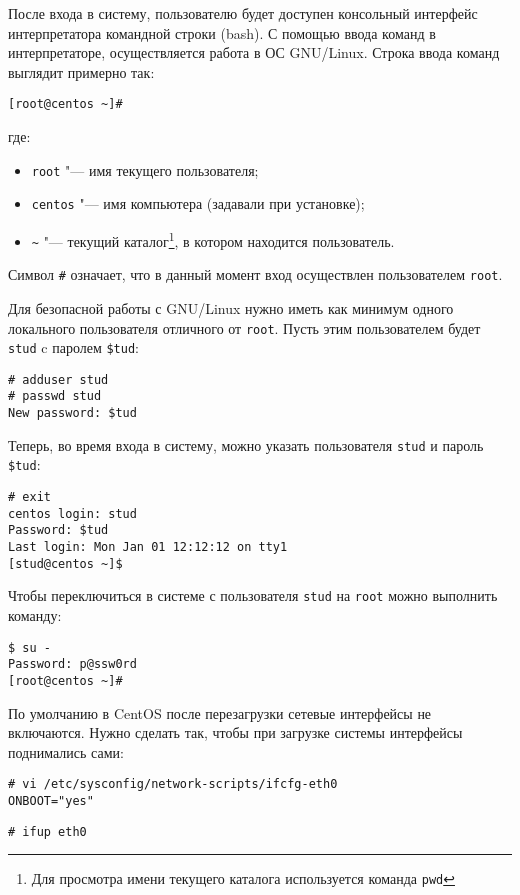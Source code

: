 После входа в систему, пользователю будет доступен консольный интерфейс интерпретатора командной строки (bash). 
С помощью ввода команд в интерпретаторе, осуществляется работа в ОС GNU/Linux.
\clearpage
Строка ввода команд выглядит примерно так:
\begin{lstlisting}
[root@centos ~]# 
\end{lstlisting}
где:
\begin{itemize}
    \item \texttt{root} "--- имя текущего пользователя;
    \item \texttt{centos} "--- имя компьютера (задавали при установке);
    \item \texttt{\~} "--- {текущий каталог}\footnote{Для просмотра имени текущего каталога используется команда \texttt{pwd}}, в котором находится пользователь.
\end{itemize}

Символ \texttt{\#} означает, что в данный момент вход осуществлен пользователем \texttt{root}.

Для безопасной работы с GNU/Linux нужно иметь как минимум одного локального пользователя отличного от \texttt{root}.
Пусть этим пользователем будет \texttt{stud} c паролем \texttt{\$tud}:
\begin{lstlisting}
# adduser stud
# passwd stud
New password: $tud
\end{lstlisting}

Теперь, во время входа в систему, можно указать пользователя \texttt{stud} и пароль \texttt{\$tud}:
\begin{lstlisting}
# exit
centos login: stud
Password: $tud
Last login: Mon Jan 01 12:12:12 on tty1
[stud@centos ~]$ 
\end{lstlisting}

Чтобы переключиться в системе с пользователя \texttt{stud} на \texttt{root} можно выполнить команду:
\begin{lstlisting}
$ su -
Password: p@ssw0rd
[root@centos ~]#  
\end{lstlisting}

По умолчанию в CentOS после перезагрузки сетевые интерфейсы не включаются. 
Нужно сделать так, чтобы при загрузке системы интерфейсы поднимались сами:
\begin{lstlisting}
# vi /etc/sysconfig/network-scripts/ifcfg-eth0
ONBOOT="yes"
\end{lstlisting}
\begin{lstlisting}
# ifup eth0
\end{lstlisting}

